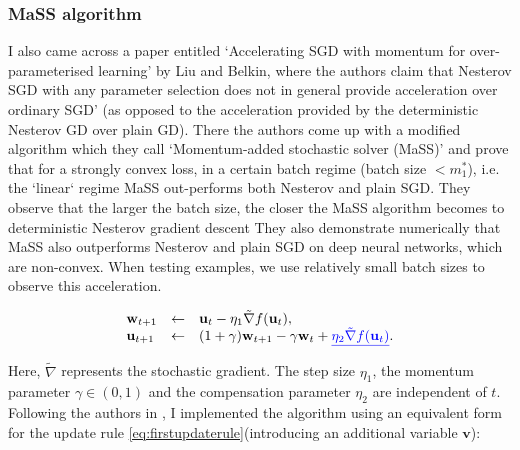 \documentclass{article}
\theoremstyle{mystyle}
\begin{document}
\subsubsection{MaSS algorithm}

 I also came across a paper entitled ‘Accelerating SGD with momentum for over-parameterised learning’ by Liu and Belkin, where the authors claim that Nesterov SGD with any parameter selection does not in general provide acceleration over ordinary SGD’ (as opposed to the acceleration provided by the deterministic Nesterov GD over plain GD). There the authors come up with a modified algorithm which they call ‘Momentum-added stochastic solver (MaSS)’ and prove that for a strongly convex loss, in a certain batch regime (batch size $ <m_{1}^{*}$), i.e. the `linear` regime MaSS out-performs both Nesterov and plain SGD. They observe that the larger the batch size, the closer the MaSS algorithm becomes to deterministic Nesterov gradient descent  They also demonstrate numerically that MaSS also outperforms Nesterov and plain SGD on deep neural networks, which are non-convex. When testing examples, we use relatively small batch sizes to observe this acceleration.

 \begin{eqnarray}\left.\begin{array}{lll}
\mathbf{w}_{t+1} &\leftarrow& \mathbf{u}_t - \eta_1 \tilde{\nabla}f(\mathbf{u}_t), \\
\mathbf{u}_{t+1} &\leftarrow& (1+\gamma)\mathbf{w}_{t+1} - \gamma \mathbf{w}_{t} + \underline{\color{blue}  \eta_2 \tilde{\nabla}f(\mathbf{u}_t)}.\end{array}\right.\label{eq:firstupdaterule}
\end{eqnarray}

Here, $\tilde{\nabla}$ represents the stochastic gradient. The step size $\eta_1$, the  momentum parameter $\gamma \in (0,1)$ and the compensation parameter $\eta_2$ are independent of $t$. Following the authors in \cite{liu2019acceleratingsgdmomentumoverparameterized}, I implemented the algorithm using an equivalent form for the update rule \ref{eq:firstupdaterule}(introducing an additional variable $\mathbf{v}$):
\end{document}
